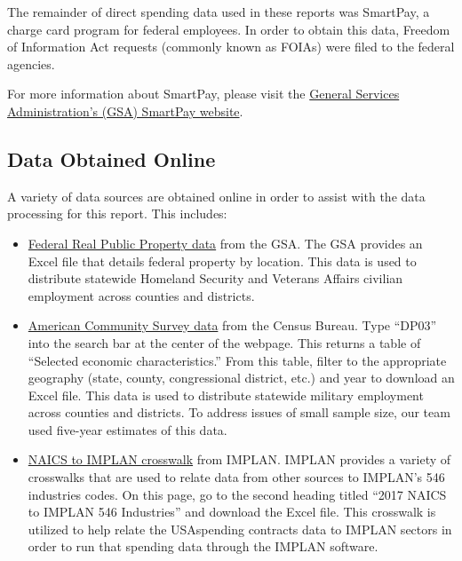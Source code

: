 \documentclass[
]{book}
\begin{document}
The remainder of direct spending data used in these reports was SmartPay, a charge card program for federal employees. In order to obtain this data, Freedom of Information Act requests (commonly known as FOIAs) were filed to the federal agencies.

For more information about SmartPay, please visit the \href{https://www.gsa.gov/travel/plan-book/gsa-smartpay}{General Services Administration's (GSA) SmartPay website}.

\hypertarget{data-obtained-online}{%
\subsection{Data Obtained Online}\label{data-obtained-online}}

A variety of data sources are obtained online in order to assist with the data processing for this report. This includes:

\begin{itemize}
\item
  \href{https://www.gsa.gov/policy-regulations/policy/real-property-policy/asset-management/federal-real-property-profile-frpp/federal-real-property-public-data-set}{Federal Real Public Property data} from the GSA. The GSA provides an Excel file that details federal property by location. This data is used to distribute statewide Homeland Security and Veterans Affairs civilian employment across counties and districts.
\item
  \href{https://data.census.gov/cedsci/}{American Community Survey data} from the Census Bureau. Type ``DP03'' into the search bar at the center of the webpage. This returns a table of ``Selected economic characteristics.'' From this table, filter to the appropriate geography (state, county, congressional district, etc.) and year to download an Excel file. This data is used to distribute statewide military employment across counties and districts. To address issues of small sample size, our team used five-year estimates of this data.
\item
  \href{https://support.implan.com/hc/en-us/articles/360034896614-546-Industries-Conversions-Bridges-Construction-2018-Data}{NAICS to IMPLAN crosswalk} from IMPLAN. IMPLAN provides a variety of crosswalks that are used to relate data from other sources to IMPLAN's 546 industries codes. On this page, go to the second heading titled ``2017 NAICS to IMPLAN 546 Industries'' and download the Excel file. This crosswalk is utilized to help relate the USAspending contracts data to IMPLAN sectors in order to run that spending data through the IMPLAN software.
\end{itemize}
\end{document}
